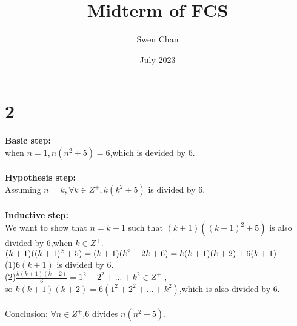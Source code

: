 \documentclass{article}
\title{Midterm of FCS}
\author{Swen Chan}
\date{July 2023}
\begin{document}
\maketitle

\section*{2}
\textbf{Basic step:}\\
when \(n=1,n(n^2+5)=6\),which is devided by 6.\\\\
\textbf{Hypothesis step:}\\
Assuming \(n=k,\forall k\in Z^+,k(k^2+5)\) is divided by 6.\\\\
\textbf{Inductive step:}\\We want to show that \(n=k+1\) such that \((k+1)((k+1)^2+5)\) is also divided by 6,when \(k\in Z^+\).\\
\((k+1)((k+1)^2+5)\\=(k+1)(k^2+2k+6)\\=k(k+1)(k+2)+6(k+1)\)\\
(1)\(6(k+1)\) is divided by 6. \\
(2)\(\frac {k(k+1)(k+2)}{6}=1^2+2^2+...+k^2\in Z^+\) ,\\so \(k(k+1)(k+2)=6(1^2+2^2+...+k^2)\),which is also divided by 6.\\\\
Conclusion: \(\forall n\in Z^+\),6 divides \(n(n^2+5).\)\\\\
\end{document}
